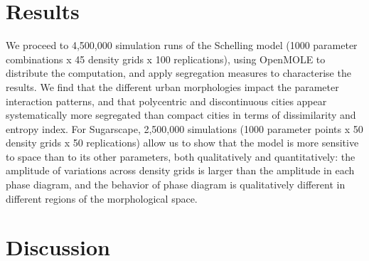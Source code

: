 \documentclass[11pt]{article}
\begin{document}
\section{Results}


We proceed to 4,500,000 simulation runs of the Schelling model (1000 parameter combinations x 45 density grids x 100 replications), using OpenMOLE to distribute the computation, and apply segregation measures to characterise the results. We find that the different urban morphologies impact the parameter interaction patterns, and that polycentric and discontinuous cities appear systematically more segregated than compact cities in terms of dissimilarity and entropy index. For Sugarscape, 2,500,000 simulations (1000 parameter points x 50 density grids x 50 replications) allow us to show that the model is more sensitive to space than to its other parameters, both qualitatively and quantitatively: the amplitude of variations across density grids is larger than the amplitude in each phase diagram, and the behavior of phase diagram is qualitatively different in different regions of the morphological space.

\section{Discussion}






%
%
%
%
%
%
\end{document}

